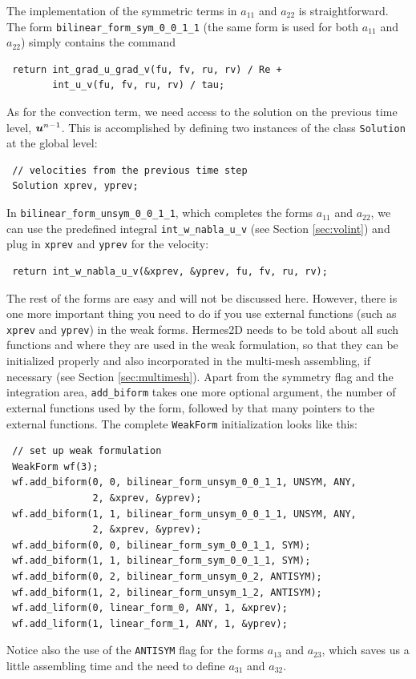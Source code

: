 The implementation of the symmetric terms in $a_{11}$ and $a_{22}$ is straightforward. The form
\verb"bilinear_form_sym_0_0_1_1" (the same form is used for both $a_{11}$ and $a_{22}$)
simply contains the command
\begin{lstlisting}
 return int_grad_u_grad_v(fu, fv, ru, rv) / Re +
        int_u_v(fu, fv, ru, rv) / tau;
\end{lstlisting}
As for the convection term, we need access to the solution on the previous time level, $\mbox{\boldmath $u$}^{n-1}$.
This is accomplished by defining two instances of the class {\tt Solution} at the global level:
\begin{lstlisting}
 // velocities from the previous time step
 Solution xprev, yprev;
\end{lstlisting}
In \verb"bilinear_form_unsym_0_0_1_1", which completes the forms $a_{11}$ and $a_{22}$, we can use
the predefined integral \verb"int_w_nabla_u_v" (see Section \ref{sec:volint})
and plug in {\tt xprev} and {\tt yprev} for the velocity:
\begin{lstlisting}
 return int_w_nabla_u_v(&xprev, &yprev, fu, fv, ru, rv);
\end{lstlisting}
The rest of the forms are easy and will not be discussed here. However, there is one more important
thing you need to do if you use external functions (such as {\tt xprev} and {\tt yprev}) in the
weak forms. Hermes2D needs to be told about all such functions and where they are used in the weak
formulation, so that they can be initialized properly and also incorporated in the multi-mesh assembling,
if necessary (see Section \ref{sec:multimesh}). Apart from the symmetry flag and the integration area,
{\tt add\_biform} takes one more optional argument, the number of external functions used by the form,
followed by that many pointers to the external functions. The complete {\tt WeakForm} initialization
looks like this:
\begin{lstlisting}
 // set up weak formulation
 WeakForm wf(3);
 wf.add_biform(0, 0, bilinear_form_unsym_0_0_1_1, UNSYM, ANY,
               2, &xprev, &yprev);
 wf.add_biform(1, 1, bilinear_form_unsym_0_0_1_1, UNSYM, ANY,
               2, &xprev, &yprev);
 wf.add_biform(0, 0, bilinear_form_sym_0_0_1_1, SYM);
 wf.add_biform(1, 1, bilinear_form_sym_0_0_1_1, SYM);
 wf.add_biform(0, 2, bilinear_form_unsym_0_2, ANTISYM);
 wf.add_biform(1, 2, bilinear_form_unsym_1_2, ANTISYM);
 wf.add_liform(0, linear_form_0, ANY, 1, &xprev);
 wf.add_liform(1, linear_form_1, ANY, 1, &yprev);
\end{lstlisting}
Notice also the use of the {\tt ANTISYM} flag for the forms $a_{13}$ and $a_{23}$, which
saves us a little assembling time and the need to define $a_{31}$ and $a_{32}$.

